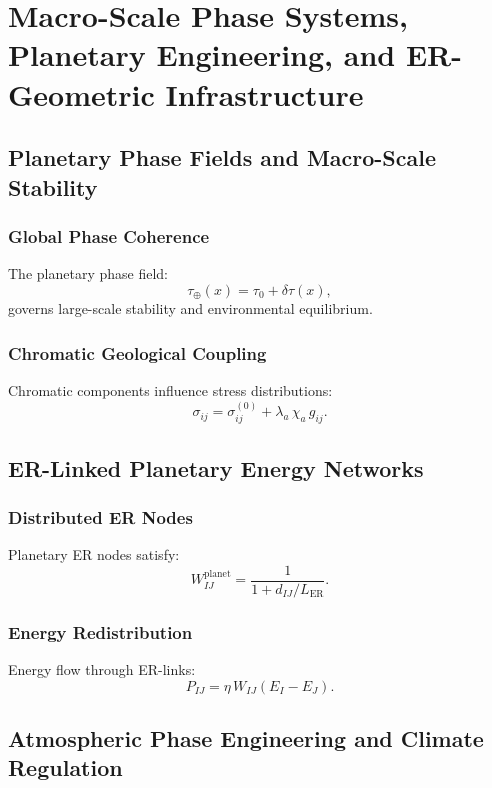 

\part{Macro-Scale Phase Systems, Planetary Engineering, and ER-Geometric Infrastructure}

\chapter{Planetary Phase Fields and Macro-Scale Stability}

\section{Global Phase Coherence}
The planetary phase field:
\[
\tau_{\oplus}(x) = \tau_0 + \delta\tau(x),
\]
governs large-scale stability and environmental equilibrium.

\section{Chromatic Geological Coupling}
Chromatic components influence stress distributions:
\[
\sigma_{ij} = \sigma_{ij}^{(0)} + \lambda_a\,\chi_a\,g_{ij}.
\]

\chapter{ER-Linked Planetary Energy Networks}

\section{Distributed ER Nodes}
Planetary ER nodes satisfy:
\[
W_{IJ}^{\text{planet}} = \frac{1}{1 + d_{IJ}/L_{\mathrm{ER}}}.
\]

\section{Energy Redistribution}
Energy flow through ER-links:
\[
P_{IJ} = \eta\, W_{IJ}(E_I - E_J).
\]

\chapter{Atmospheric Phase Engineering and Climate Regulation}

